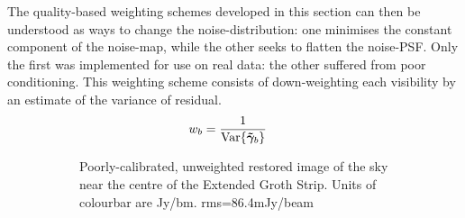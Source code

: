 \pg
The quality-based weighting schemes developed in this section can then be understood as ways to change the noise-distribution: one minimises the constant component of the noise-map, while the other seeks to flatten the noise-PSF. Only the first was implemented for use on real data: the other suffered from poor conditioning. This weighting scheme consists of down-weighting each visibility by an estimate of the variance of residual.
\begin{align}
w_{b} &= \frac{1}{\textrm{Var}\{\bm{\tilde{\gamma}}_{b}\}}
\end{align}

\begin{figure}[h!]
\begin{subfigure}{.49\textwidth}
\caption{\label{image.3c295.nocorr1} Poorly-calibrated, unweighted restored image of the sky near the centre of the Extended Groth Strip. {Units of colourbar are Jy/bm}. rms=86.4mJy/beam}
\end{subfigure}
\begin{subfigure}{.49\textwidth}

\end{subfigure}
\end{figure}
